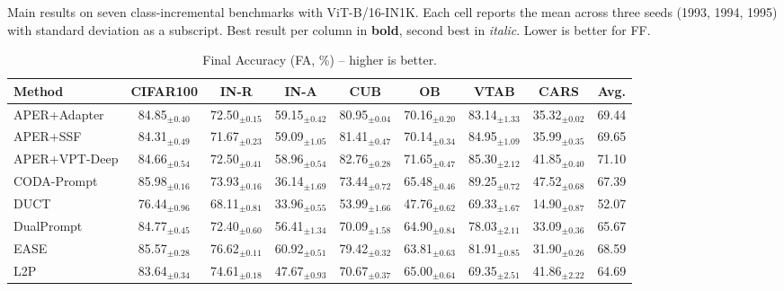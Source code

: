 \begin{table}[!t]
\centering
\caption{Main results on seven class-incremental benchmarks with ViT-B/16-IN1K. Each cell reports the mean across three seeds (1993, 1994, 1995) with standard deviation as a subscript. Best result per column in \textbf{bold}, second best in \textit{italic}. Lower is better for FF.}
\label{tab:overall}

\begin{subtable}{\textwidth}
  \centering
  \caption{Final Accuracy (FA, \%) -- higher is better.}
  \label{tab:overall-fa}
  \renewcommand{\arraystretch}{0.95}
\begin{adjustbox}{max width=\textwidth}
\footnotesize
\begin{tabular}{l c c c c c c c c}
\toprule
Method & \textbf{CIFAR100} & \textbf{IN-R} & \textbf{IN-A} & \textbf{CUB} & \textbf{OB} & \textbf{VTAB} & \textbf{CARS} & \textbf{Avg.} \\
\midrule
APER+Adapter & 84.85$_{\pm 0.40}$ & 72.50$_{\pm 0.15}$ & 59.15$_{\pm 0.42}$ & 80.95$_{\pm 0.04}$ & 70.16$_{\pm 0.20}$ & 83.14$_{\pm 1.33}$ & 35.32$_{\pm 0.02}$ & 69.44 \\
APER+SSF & 84.31$_{\pm 0.49}$ & 71.67$_{\pm 0.23}$ & 59.09$_{\pm 1.05}$ & 81.41$_{\pm 0.47}$ & 70.14$_{\pm 0.34}$ & 84.95$_{\pm 1.09}$ & 35.99$_{\pm 0.35}$ & 69.65 \\
APER+VPT-Deep & 84.66$_{\pm 0.54}$ & 72.50$_{\pm 0.41}$ & 58.96$_{\pm 0.54}$ & 82.76$_{\pm 0.28}$ & 71.65$_{\pm 0.47}$ & 85.30$_{\pm 2.12}$ & 41.85$_{\pm 0.40}$ & 71.10 \\
CODA-Prompt & 85.98$_{\pm 0.16}$ & 73.93$_{\pm 0.16}$ & 36.14$_{\pm 1.69}$ & 73.44$_{\pm 0.72}$ & 65.48$_{\pm 0.46}$ & 89.25$_{\pm 0.72}$ & 47.52$_{\pm 0.68}$ & 67.39 \\
DUCT & 76.44$_{\pm 0.96}$ & 68.11$_{\pm 0.81}$ & 33.96$_{\pm 0.55}$ & 53.99$_{\pm 1.66}$ & 47.76$_{\pm 0.62}$ & 69.33$_{\pm 1.67}$ & 14.90$_{\pm 0.87}$ & 52.07 \\
DualPrompt & 84.77$_{\pm 0.45}$ & 72.40$_{\pm 0.60}$ & 56.41$_{\pm 1.34}$ & 70.09$_{\pm 1.58}$ & 64.90$_{\pm 0.84}$ & 78.03$_{\pm 2.11}$ & 33.09$_{\pm 0.36}$ & 65.67 \\
EASE & 85.57$_{\pm 0.28}$ & 76.62$_{\pm 0.11}$ & 60.92$_{\pm 0.51}$ & 79.42$_{\pm 0.32}$ & 63.81$_{\pm 0.63}$ & 81.91$_{\pm 0.85}$ & 31.90$_{\pm 0.26}$ & 68.59 \\
L2P & 83.64$_{\pm 0.34}$ & 74.61$_{\pm 0.18}$ & 47.67$_{\pm 0.93}$ & 70.67$_{\pm 0.37}$ & 65.00$_{\pm 0.64}$ & 69.35$_{\pm 2.51}$ & 41.86$_{\pm 2.22}$ & 64.69 \\

\end{tabular}
\end{adjustbox}
\end{subtable}
\end{table}
